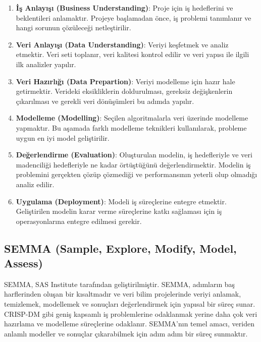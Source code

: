 \begin{enumerate}
    \item \textbf{İş Anlayışı (Business Understanding)}: Proje için iş hedeflerini ve beklentileri anlamaktır. Projeye başlamadan önce, iş problemi tanımlanır ve hangi sorunun çözüleceği netleştirilir.
    \item \textbf{Veri Anlayışı (Data Understanding)}: Veriyi keşfetmek ve analiz etmektir. Veri seti toplanır, veri kalitesi kontrol edilir ve veri yapısı ile ilgili ilk analizler yapılır.
    \item \textbf{Veri Hazırlığı (Data Prepartion)}: Veriyi modelleme için hazır hale getirmektir. Verideki eksikliklerin doldurulması, gereksiz değişkenlerin çıkarılması ve gerekli veri dönüşümleri bu adımda yapılır.
    \item \textbf{Modelleme (Modelling)}: Seçilen algoritmalarla veri üzerinde modelleme yapmaktır. Bu aşamada farklı modelleme teknikleri kullanılarak, probleme uygun en iyi model geliştirilir.
    \item \textbf{Değerlendirme (Evaluation)}: Oluşturulan modelin, iş hedefleriyle ve veri madenciliği hedefleriyle ne kadar örtüştüğünü değerlendirmektir. Modelin iş problemini gerçekten çözüp çözmediği ve performansının yeterli olup olmadığı analiz edilir.
    \item \textbf{Uygulama (Deployment)}: Modeli iş süreçlerine entegre etmektir. Geliştirilen modelin karar verme süreçlerine katkı sağlaması için iş operasyonlarına entegre edilmesi gerekir.
\end{enumerate}

\newpage

\subsection{SEMMA (Sample, Explore, Modify, Model, Assess)}

SEMMA, SAS Institute tarafından geliştirilmiştir. SEMMA, adımların baş harflerinden oluşan bir kısaltmadır ve veri bilim projelerinde veriyi anlamak, temizlemek, modellemek ve sonuçları değerlendirmek için yapısal bir süreç sunar. CRISP-DM gibi geniş kapsamlı iş problemlerine odaklanmak yerine daha çok veri hazırlama ve modelleme süreçlerine odaklanır. SEMMA'nın temel amacı, veriden anlamlı modeller ve sonuçlar çıkarabilmek için adım adım bir süreç sunmaktır.

